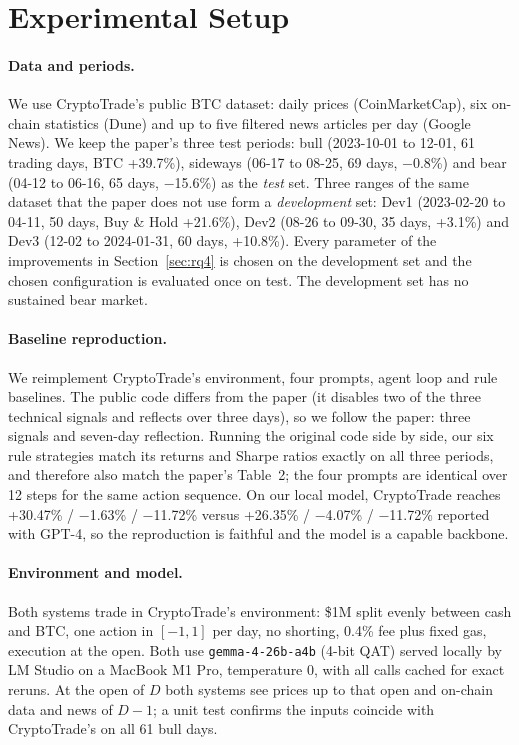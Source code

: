 \documentclass[11pt]{article}
\begin{document}
\section{Experimental Setup}

\paragraph{Data and periods.}
We use CryptoTrade's public BTC dataset: daily prices (CoinMarketCap), six on-chain statistics (Dune) and up to five
filtered news articles per day (Google News). We keep the paper's three test periods: bull (2023-10-01 to 12-01,
61 trading days, BTC +39.7\%), sideways (06-17 to 08-25, 69 days, $-$0.8\%) and bear (04-12 to 06-16, 65 days,
$-$15.6\%) as the \emph{test} set. Three ranges of the same dataset that the paper does not use form a
\emph{development} set: Dev1 (2023-02-20 to 04-11, 50 days, Buy \& Hold +21.6\%), Dev2 (08-26 to 09-30, 35 days,
+3.1\%) and Dev3 (12-02 to 2024-01-31, 60 days, +10.8\%). Every parameter of the improvements in
Section~\ref{sec:rq4} is chosen on the development set and the chosen configuration is evaluated once on test. The
development set has no sustained bear market.

\paragraph{Baseline reproduction.}
We reimplement CryptoTrade's environment, four prompts, agent loop and rule baselines. The public code differs from
the paper (it disables two of the three technical signals and reflects over three days), so we follow the paper: three
signals and seven-day reflection. Running the original code side by side, our six rule strategies match its returns and
Sharpe ratios exactly on all three periods, and therefore also match the paper's Table~2; the four prompts are
identical over 12 steps for the same action sequence. On our local model, CryptoTrade reaches +30.47\% / $-$1.63\% /
$-$11.72\% versus +26.35\% / $-$4.07\% / $-$11.72\% reported with GPT-4, so the reproduction is faithful and the model is
a capable backbone.

\paragraph{Environment and model.}
Both systems trade in CryptoTrade's environment: \$1M split evenly between cash and BTC, one action in $[-1,1]$ per
day, no shorting, 0.4\% fee plus fixed gas, execution at the open. Both use \texttt{gemma-4-26b-a4b} (4-bit QAT) served
locally by LM Studio on a MacBook M1 Pro, temperature 0, with all calls cached for exact reruns. At the open of $D$ both
systems see prices up to that open and on-chain data and news of $D{-}1$; a unit test confirms the inputs coincide with
CryptoTrade's on all 61 bull days.
\end{document}
